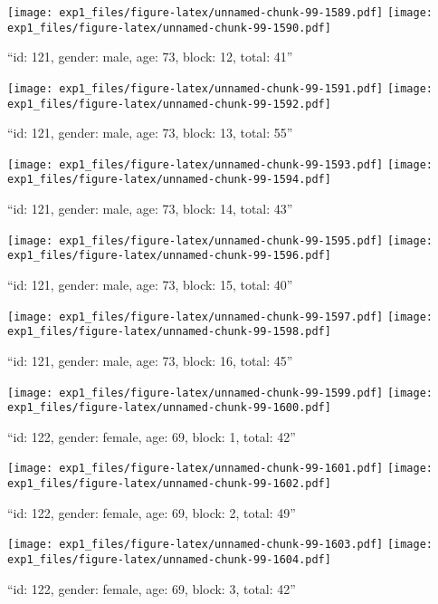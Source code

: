 \documentclass[,]{article}
\begin{document}
\texttt{[image: exp1\_files/figure-latex/unnamed-chunk-99-1589.pdf]}
\texttt{[image: exp1\_files/figure-latex/unnamed-chunk-99-1590.pdf]}

\newpage
[1] 

``id: 121, gender: male, age: 73, block: 12, total: 41''

\texttt{[image: exp1\_files/figure-latex/unnamed-chunk-99-1591.pdf]}
\texttt{[image: exp1\_files/figure-latex/unnamed-chunk-99-1592.pdf]}

\newpage
[1] 

``id: 121, gender: male, age: 73, block: 13, total: 55''

\texttt{[image: exp1\_files/figure-latex/unnamed-chunk-99-1593.pdf]}
\texttt{[image: exp1\_files/figure-latex/unnamed-chunk-99-1594.pdf]}

\newpage
[1] 

``id: 121, gender: male, age: 73, block: 14, total: 43''

\texttt{[image: exp1\_files/figure-latex/unnamed-chunk-99-1595.pdf]}
\texttt{[image: exp1\_files/figure-latex/unnamed-chunk-99-1596.pdf]}

\newpage
[1] 

``id: 121, gender: male, age: 73, block: 15, total: 40''

\texttt{[image: exp1\_files/figure-latex/unnamed-chunk-99-1597.pdf]}
\texttt{[image: exp1\_files/figure-latex/unnamed-chunk-99-1598.pdf]}

\newpage
[1] 

``id: 121, gender: male, age: 73, block: 16, total: 45''

\texttt{[image: exp1\_files/figure-latex/unnamed-chunk-99-1599.pdf]}
\texttt{[image: exp1\_files/figure-latex/unnamed-chunk-99-1600.pdf]}

\newpage
[1] 

``id: 122, gender: female, age: 69, block: 1, total: 42''

\texttt{[image: exp1\_files/figure-latex/unnamed-chunk-99-1601.pdf]}
\texttt{[image: exp1\_files/figure-latex/unnamed-chunk-99-1602.pdf]}

\newpage
[1] 

``id: 122, gender: female, age: 69, block: 2, total: 49''

\texttt{[image: exp1\_files/figure-latex/unnamed-chunk-99-1603.pdf]}
\texttt{[image: exp1\_files/figure-latex/unnamed-chunk-99-1604.pdf]}

\newpage
[1] 

``id: 122, gender: female, age: 69, block: 3, total: 42''
\end{document}
